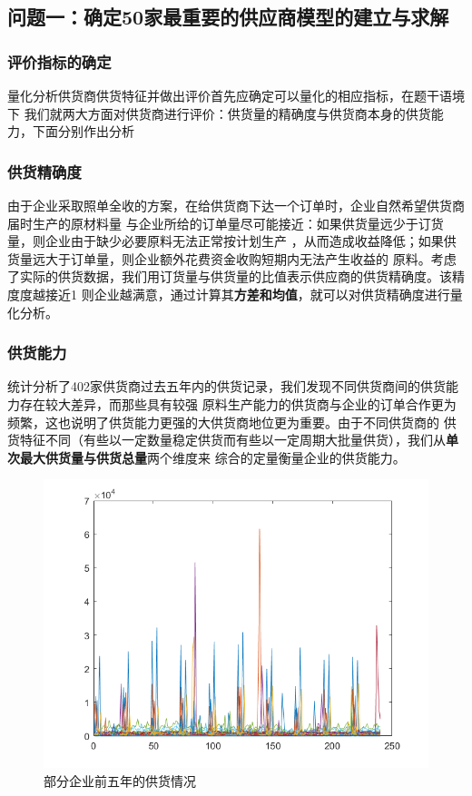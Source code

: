 \documentclass{cumcmthesis}
\begin{document}
\subsection{问题一：确定50家最重要的供应商模型的建立与求解}

\subsubsection{评价指标的确定}
量化分析供货商供货特征并做出评价首先应确定可以量化的相应指标，在题干语境下
我们就两大方面对供货商进行评价：供货量的精确度与供货商本身的供货能力，下面分别作出分析
\subsubsection*{供货精确度}
由于企业采取照单全收的方案，在给供货商下达一个订单时，企业自然希望供货商届时生产的原材料量
与企业所给的订单量尽可能接近：如果供货量远少于订货量，则企业由于缺少必要原料无法正常按计划生产
，从而造成收益降低；如果供货量远大于订单量，则企业额外花费资金收购短期内无法产生收益的
原料。考虑了实际的供货数据，我们用订货量与供货量的比值表示供应商的供货精确度。该精度度越接近1
则企业越满意，通过计算其\textbf{方差和均值}，就可以对供货精确度进行量化分析。

\subsubsection*{供货能力}
统计分析了402家供货商过去五年内的供货记录，我们发现不同供货商间的供货能力存在较大差异，而那些具有较强
原料生产能力的供货商与企业的订单合作更为频繁，这也说明了供货能力更强的大供货商地位更为重要。由于不同供货商的
供货特征不同（有些以一定数量稳定供货而有些以一定周期大批量供货），我们从\textbf{单次最大供货量与供货总量}两个维度来
综合的定量衡量企业的供货能力。\par
\begin{figure}[htbp]
    \centering
    \includegraphics[scale=0.6]{offer.png}
    \caption{部分企业前五年的供货情况}     \label{fig:1}
    \end{figure}
\end{document}
